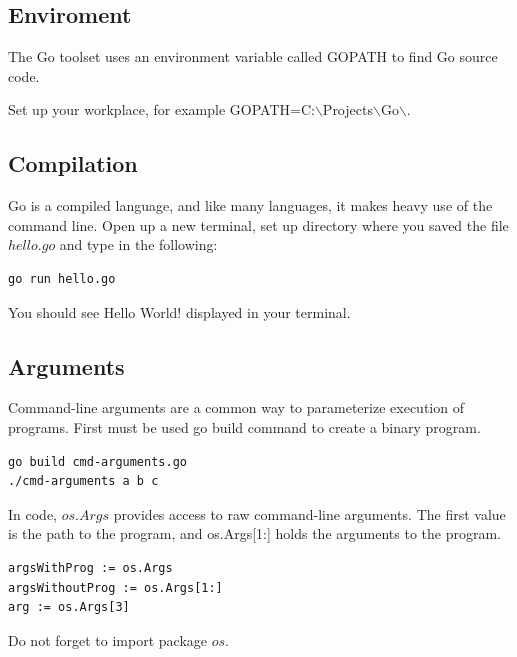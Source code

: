 \documentclass[
  digital, %
  notable,   %
  lof,     %
  lot,     %
]{fithesis3}
\begin{document}
\subsection{Enviroment}
The Go toolset uses an environment variable called GOPATH to find Go source code. 

Set up your workplace, for example GOPATH=C:$\backslash$Projects$\backslash$Go$\backslash$.

\subsection{Compilation}
Go is a compiled language, and like many languages, it makes heavy use of the command
line. Open up a new terminal, set up directory where you saved the file $hello.go$ and type in 
the following:
\begin{lstlisting}
go run hello.go
\end{lstlisting}
You should see Hello World! displayed in your terminal.

\subsection{Arguments}
Command-line arguments are a common way to parameterize execution of programs. First must be used go build command to create a binary program.
\begin{lstlisting}
go build cmd-arguments.go
./cmd-arguments a b c
\end{lstlisting}
In code, $os.Args$ provides access to raw command-line arguments. The first value is the path to the program, and os.Args[1:] holds the arguments to the program.
\begin{lstlisting}
argsWithProg := os.Args
argsWithoutProg := os.Args[1:]
arg := os.Args[3]
\end{lstlisting}
Do not forget to import package $os$.
\end{document}
